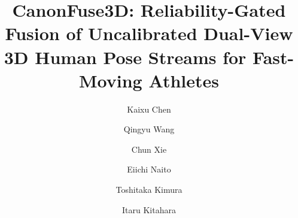 \documentclass[preprint,12pt]{elsarticle}
\begin{document}
\begin{frontmatter}

\title{CanonFuse3D: Reliability-Gated Fusion of Uncalibrated Dual-View 3D Human Pose Streams for Fast-Moving Athletes}

\author[ccs]{Kaixu Chen}
\author[imiss]{Qingyu Wang}
\author[ccs]{Chun Xie}
\author[nict]{Eiichi Naito}
\author[ntt]{Toshitaka Kimura}
\author[ccs]{Itaru Kitahara}

\address[ccs]{Center for Computational Sciences, University of Tsukuba, 1-1-1 Tennodai, Tsukuba, Ibaraki 305-8577, Japan}
\address[imiss]{Degree Programs in Systems and Information Engineering, Graduate School of Science and Technology, University of Tsukuba, 1-1-1 Tennodai, Tsukuba, Ibaraki 305-8573, Japan}
\address[nict]{Center for Information and Neural Networks (CiNet), Advanced ICT Research Institute, National Institute of Information and Communications Technology, 1-4 Yamadaoka, Suita, Osaka 565-0871, Japan}
\address[ntt]{NTT Communication Science Laboratories, NTT, Inc., 3-1 Morinosato-Wakamiya, Atsugi, Kanagawa 243-0198, Japan}


\end{frontmatter}
\end{document}
